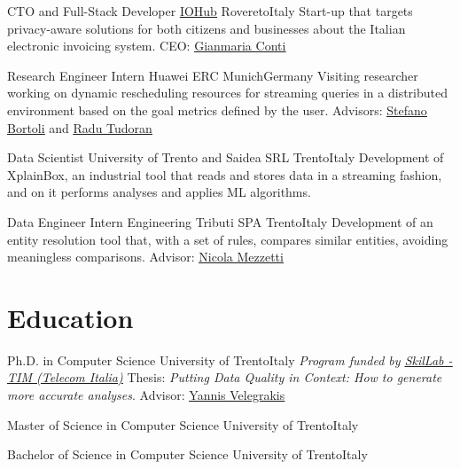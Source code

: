 \documentclass[10pt,a4paper,colorlinks,linkcolor=true]{moderncv}
\newcommand{\cvlink}[2]{\href{#1}{\ul{#2}}}
\begin{document}
  {CTO and Full-Stack Developer}
  {\cvlink{https://www.iohub.eu/}{IOHub}}
  {Rovereto}{Italy}
  {Start-up that targets privacy-aware solutions for both citizens and businesses about the Italian electronic invoicing system. CEO: \cvlink{https://www.linkedin.com/in/gianmaria-conti-38303712/}{Gianmaria Conti}}

  {Research Engineer Intern}
  {Huawei ERC}
  {Munich}{Germany}
  {Visiting researcher working on dynamic rescheduling resources for streaming queries in a distributed environment based on the goal metrics defined by the user. Advisors: \cvlink{https://www.linkedin.com/in/stefano-bortoli/}{Stefano Bortoli} and \cvlink{https://www.linkedin.com/in/radu-tudoran-37545643/}{Radu Tudoran}}

  {Data Scientist}
  {University of Trento and Saidea SRL}
  {Trento}{Italy}
  {Development of XplainBox, an industrial tool that reads and stores data in a streaming fashion, and on it performs analyses and applies ML algorithms.}

  {Data Engineer Intern}
  {Engineering Tributi SPA}
  {Trento}{Italy}
  {Development of an entity resolution tool that, with a set of rules, compares similar entities, avoiding meaningless comparisons. Advisor: \cvlink{https://www.linkedin.com/in/nicolamezzetti/}{Nicola Mezzetti}}



\section{Education}

  {Ph.D. in Computer Science}
  {University of Trento}{Italy}
  {\textit{Program funded by \cvlink{https://www.telecomitalia.com/en/innovation/open-innovation/tim-open-labs.html}{SkilLab - TIM (Telecom Italia)}}}
  {Thesis: \emph{Putting Data Quality in Context: How to generate more accurate analyses}. Advisor: \cvlink{https://scholar.google.it/citations?user=FI1rYesAAAAJ}{Yannis Velegrakis}}

  {Master of Science in Computer Science}
  {University of Trento}{Italy}
  {}
  {}

  {Bachelor of Science in Computer Science}
  {University of Trento}{Italy}
  {}
  {}
\end{document}
